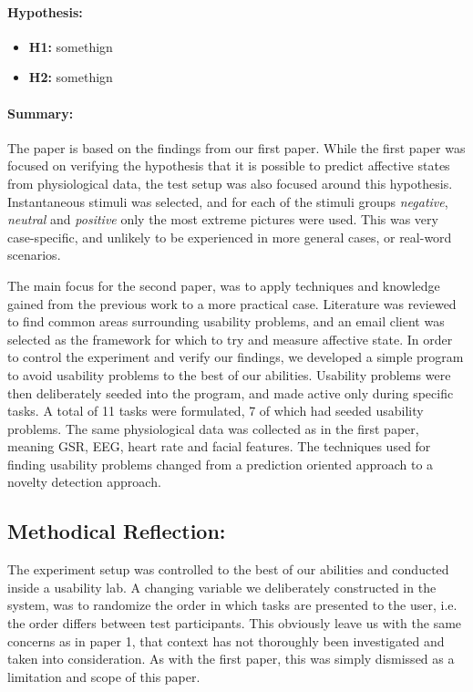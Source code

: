 \paragraph{Hypothesis:}
\begin{itemize}
    \item \textbf{H1:} somethign
    \item \textbf{H2:} somethign
\end{itemize}
\paragraph{Summary:}
The paper is based on the findings from our first paper. While the first paper was focused on verifying the hypothesis
that it is possible to predict affective states from physiological data, the test setup was also focused around this
hypothesis.  Instantaneous stimuli was selected, and for each of the stimuli groups \textit{negative}, \textit{neutral}
and \textit{positive} only the most extreme pictures were used.  This was very case-specific, and unlikely to be
experienced in more general cases, or real-word scenarios.

The main focus for the second paper, was to apply techniques and knowledge gained from the previous work to a more
practical case. Literature was reviewed to find common areas surrounding usability
problems, and an email client was selected as the framework for which to try and measure affective state.  In order to
control the experiment and verify our findings, we developed a simple program to avoid usability problems to the best of
our abilities. Usability problems were then deliberately seeded into the program, and made active only during specific tasks.  A
total of 11 tasks were formulated, 7 of which had seeded usability problems.  The same physiological data was
collected as in the first paper, meaning GSR, EEG, heart rate and facial features.  The techniques used for finding usability
problems changed from a prediction oriented approach to a novelty detection approach.

\subsection{Methodical Reflection:}
The experiment setup was controlled to the best of our abilities and conducted inside a usability lab. A changing
variable we deliberately constructed in the system, was to randomize the order in which tasks are presented to the user,
i.e. the order differs between test participants.
This obviously leave us with the same concerns as in paper 1, that context has not thoroughly been investigated and taken
into consideration. As with the first paper, this was simply dismissed as a limitation and scope of this paper.

